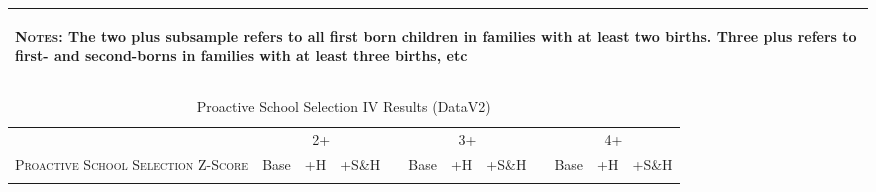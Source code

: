 \begin{landscape}
\begin{table}[htpb!]
\begin{center}
\begin{tabular}{lcccp{2mm}cccp{2mm}ccc}
\midrule\multicolumn{12}{p{19.2cm}}{\begin{footnotesize}\textsc{Notes:} The two plus subsample refers to all first born children in families with at least two births.  Three plus refers to first- and second-borns in families with at least three births, etc\end{footnotesize}} \\ \bottomrule 
\end{tabular}\end{center}\end{table}\end{landscape}\begin{landscape}\begin{table}[htpb!]\caption{Proactive School Selection IV Results (DataV2)}
\label{TWINtab:IVAll}
\begin{center}\begin{tabular}{lcccp{2mm}cccp{2mm}ccc}
\toprule \toprule 
&\multicolumn{3}{c}{2+}&&\multicolumn{3}{c}{3+}&&\multicolumn{3}{c}{4+}\\ \cmidrule(r){2-4} \cmidrule(r){6-8} \cmidrule(r){10-12} 
\textsc{Proactive School Selection Z-Score}&Base&+H&+S\&H&&Base&+H&+S\&H&&Base&+H&+S\&H\\ \midrule 
\begin{footnotesize}\end{footnotesize}& 
\begin{footnotesize}\end{footnotesize}& 
\begin{footnotesize}\end{footnotesize}& 
\begin{footnotesize}\end{footnotesize}& 
\begin{footnotesize}\end{footnotesize}& 
\begin{footnotesize}\end{footnotesize}& 
\begin{footnotesize}\end{footnotesize}& 
\begin{footnotesize}\end{footnotesize}& 
\begin{footnotesize}\end{footnotesize}& 
\begin{footnotesize}\end{footnotesize}& 
\begin{footnotesize}\end{footnotesize}& 

\end{tabular}
\end{center}
\end{table}
\end{landscape}
